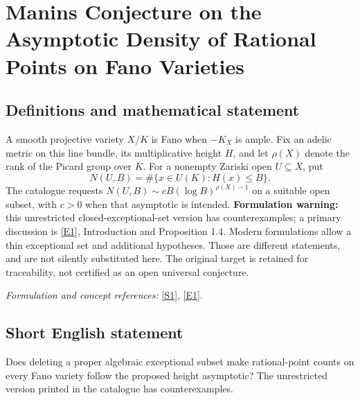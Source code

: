 \documentclass[11pt,a4paper]{article}
\newcommand{\sref}[2]{\hyperlink{source:#1:#2}{[S#2]}}
\newcommand{\eref}[2]{\hyperlink{extra:#1:#2}{[E#2]}}
\newif\ifshowcatalogue
\newcommand{\cataloguescope}[1]{\ifshowcatalogue
 \paragraph{Exact scope in the supplied catalogue.}
 \begin{quote}\small #1\end{quote}\fi}
\numberwithin{equation}{section}
\begin{document}
\setcounter{section}{158}
\clearpage
\section{\texorpdfstring{Manins Conjecture on the Asymptotic Density of Rational Points on Fano Varieties}{Manins Conjecture on the Asymptotic Density of Rational Points on Fano Varieties}}\label{159}
\subsection{Definitions and mathematical statement}
A smooth projective variety $X/K$ is Fano when $-K_X$ is ample. Fix an adelic metric on this line bundle, its multiplicative height $H$, and let $\rho(X)$ denote the rank of the Picard group over $K$. For a nonempty Zariski open $U\subseteq X$, put
\[
 N(U,B)=\#\{x\in U(K):H(x)\le B\}.
\]
The catalogue requests $N(U,B)\sim cB(\log B)^{\rho(X)-1}$ on a suitable open subset, with $c>0$ when that asymptotic is intended. \textbf{Formulation warning:} this unrestricted closed-exceptional-set version has counterexamples; a primary discussion is \eref{159}{1}, Introduction and Proposition 1.4. Modern formulations allow a thin exceptional set and additional hypotheses. Those are different statements, and are not silently substituted here. The original target is retained for traceability, not certified as an open universal conjecture.
\par\smallskip\textit{Formulation and concept references:} \sref{159}{1}, \eref{159}{1}.
\cataloguescope{Prove that for any smooth Fano variety X over a number field K with ample anticanonical bundle, the number of rational points of anticanonical height <= B on a Zariski open subset satisfies N(U, B) \textasciitilde{} c B (log B)\textasciicircum{}\{rho(X)-1\}.}
\subsection{Short English statement}
Does deleting a proper algebraic exceptional subset make rational-point counts on every Fano variety follow the proposed height asymptotic? The unrestricted version printed in the catalogue has counterexamples.
\end{document}
